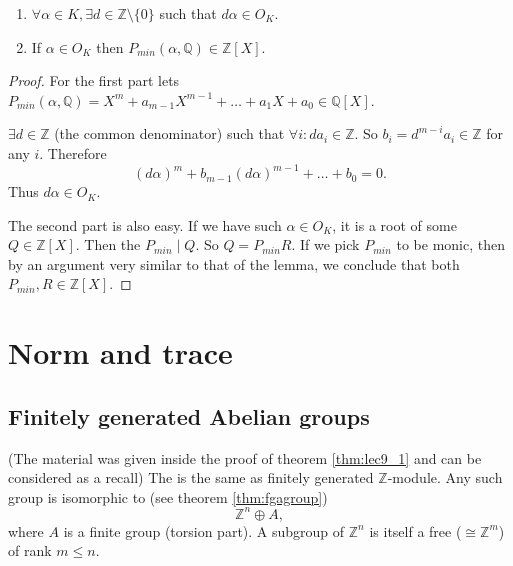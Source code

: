 \begin{property}
  \begin{enumerate}
  \item $\forall \alpha \in K, \exists d \in \mathbb{Z} \setminus
    \{0\}$ such that $d\alpha \in O_K$.
  \item If $\alpha \in O_K$ then $P_{min}\left(\alpha,
    \mathbb{Q}\right) \in \mathbb{Z}\left[X\right]$.
  \end{enumerate}
  \begin{proof}
    For the first part lets
    $P_{min}\left(\alpha,
    \mathbb{Q}\right) = X^m + a_{m-1}X^{m-1} + \dots + a_1 X + a_0
    \in \mathbb{Q}\left[X\right]$.

    $\exists d \in \mathbb{Z}$ (the common denominator) such that
    $\forall i: d a_i \in \mathbb{Z}$. So
    $b_i = d^{m-i}a_i \in \mathbb{Z}$ for any $i$. Therefore
    \[
    \left(d \alpha\right)^m + b_{m-1} \left(d \alpha\right)^{m-1} +
    \dots + b_0 = 0.
    \]
    Thus $d \alpha \in O_K$.

    The second part is also easy. If we have such
    $\alpha \in O_K$, it is a
    root of some 
    $Q \in \mathbb{Z}\left[X\right]$.
    Then the $P_{min} \mid Q$. So $Q = P_{min} R$.
    If we pick $P_{min}$ to be monic, then by an
    argument very similar to that of the  lemma,
    we conclude  that both $P_{min}, R \in \mathbb{Z}\left[X\right]$.  
  \end{proof}
  \label{property:lec9_2}
\end{property}

\section{Norm and trace}

\subsection{Finitely generated Abelian groups}
(The material was given inside the proof of theorem \ref{thm:lec9_1}
and can be considered as a recall)
The  is the same as
finitely generated $\mathbb{Z}$-module. Any such group is isomorphic
to (see theorem \ref{thm:fgagroup})
\[
\mathbb{Z}^n \oplus A,
\]
where $A$ is a finite group (torsion part). A subgroup of
$\mathbb{Z}^n$ is itself a free ($\cong \mathbb{Z}^m$) of rank
$m \le n$.

